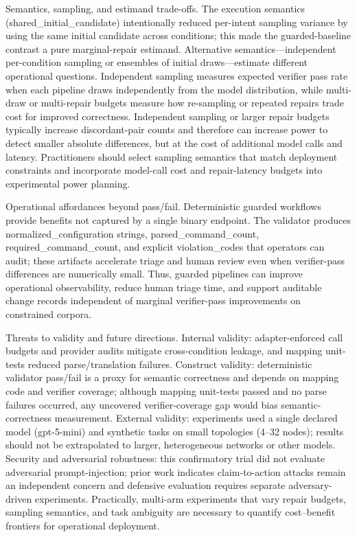 \documentclass[conference]{IEEEtran}
\begin{document}
Semantics, sampling, and estimand trade-offs. The execution semantics (shared\_initial\_candidate) intentionally reduced per-intent sampling variance by using the same initial candidate across conditions; this made the guarded-baseline contrast a pure marginal-repair estimand. Alternative semantics---independent per-condition sampling or ensembles of initial draws---estimate different operational questions. Independent sampling measures expected verifier pass rate when each pipeline draws independently from the model distribution, while multi-draw or multi-repair budgets measure how re-sampling or repeated repairs trade cost for improved correctness. Independent sampling or larger repair budgets typically increase discordant-pair counts and therefore can increase power to detect smaller absolute differences, but at the cost of additional model calls and latency. Practitioners should select sampling semantics that match deployment constraints and incorporate model-call cost and repair-latency budgets into experimental power planning.

Operational affordances beyond pass/fail. Deterministic guarded workflows provide benefits not captured by a single binary endpoint. The validator produces normalized\_configuration strings, parsed\_command\_count, required\_command\_count, and explicit violation\_codes that operators can audit; these artifacts accelerate triage and human review even when verifier-pass differences are numerically small. Thus, guarded pipelines can improve operational observability, reduce human triage time, and support auditable change records independent of marginal verifier-pass improvements on constrained corpora.

Threats to validity and future directions. Internal validity: adapter-enforced call budgets and provider audits mitigate cross-condition leakage, and mapping unit-tests reduced parse/translation failures. Construct validity: deterministic validator pass/fail is a proxy for semantic correctness and depends on mapping code and verifier coverage; although mapping unit-tests passed and no parse failures occurred, any uncovered verifier-coverage gap would bias semantic-correctness measurement. External validity: experiments used a single declared model (gpt-5-mini) and synthetic tasks on small topologies (4--32 nodes); results should not be extrapolated to larger, heterogeneous networks or other models. Security and adversarial robustness: this confirmatory trial did not evaluate adversarial prompt-injection; prior work indicates claim-to-action attacks remain an independent concern and defensive evaluation requires separate adversary-driven experiments. Practically, multi-arm experiments that vary repair budgets, sampling semantics, and task ambiguity are necessary to quantify cost--benefit frontiers for operational deployment.
\end{document}
